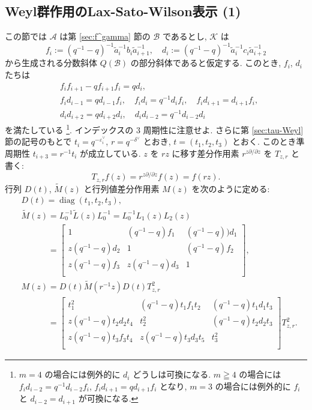 \documentclass[12pt,twoside,dvipdfm]{msjproc}
\theoremstyle{definition} %
\theoremstyle{definition} %
\theoremstyle{definition} %
\numberwithin{theorem}{section}
\numberwithin{equation}{section}
\numberwithin{figure}{section}
\numberwithin{table}{section}
\newcommand\secref[1]{第 \ref{#1} 節}
\newcommand\A{\mathcal{A}}
\newcommand\K{\mathcal{K}}
\newcommand\B{\mathcal{B}}
\newcommand\diag{\mathop{\mathrm{diag}}\nolimits}
\newcommand\tL{{\widetilde{L}}}
\newcommand\tM{{\widetilde{M}}}
\newcommand\ta{{\tilde{a}}}
\newcommand\ev{\varepsilon^\vee}
\newcommand\dv{\delta^\vee}
\begin{document}
\subsection{Weyl群作用のLax-Sato-Wilson表示 (1)}
\label{sec:Sato-Wilson-1}

この節では $\A$ は\secref{sec:f^gamma}の $\B$ であるとし, 
$\K$ は
\begin{equation*}
  f_i:=(q^{-1}-q)^{-1}\ta_i^{-1}b_i\ta_{i+1}^{-1}, \quad
  d_i:=(q^{-1}-q)^{-1}\ta_i^{-1}c_i\ta_{i+2}^{-1}
\end{equation*}
から生成される分数斜体 $Q(\B)$ の部分斜体であると仮定する.
このとき, $f_i$, $d_i$ たちは
\begin{align*}
 &
 f_i f_{i+1} - q f_{i+1}f_i = q d_i,
 \\ &
 f_id_{i-1}=q d_{i-1}f_i, \quad
 f_id_i=q^{-1} d_i f_i, \quad
 f_id_{i+1}=d_{i+1}f_i,
 \\ &
 d_i d_{i+2} = q d_{i+2} d_i, \quad
 d_i d_{i-2} = q^{-1} d_{i-2} d_i
\end{align*}
を満たしている%
\footnote{$m=4$ の場合には例外的に $d_i$ どうしは可換になる.
$m\geqq4$ の場合には $f_id_{i-2}=q^{-1}d_{i-2}f_i$, $f_id_{i+1}=qd_{i+1}f_i$ となり, 
$m=3$ の場合には例外的に $f_i$ と $d_{i-2}=d_{i+1}$ が可換になる.}. %
インデックスの $3$ 周期性に注意せよ.
さらに\secref{sec:tau-Weyl}の記号のもとで $t_i = q^{-\ev_i}$, $r=q^{-\dv}$ とおき, 
$t=(t_1,t_2,t_3)$ とおく. このとき準周期性 $t_{i+3}=r^{-1}t_i$
が成立している. 
$z$ を $rz$ に移す差分作用素 $r^{z\partial/\partial z}$ を $T_{z,r}$ と書く:
\begin{equation*}
  T_{z,r}f(z) = r^{z\partial/\partial z}f(z) = f(rz).
\end{equation*}
行列 $D(t)$, $\tM(z)$ と行列値差分作用素 $M(z)$ を次のように定める: 
\begin{align*}
  &
  D(t) = \diag(t_1,t_2,t_3), 
  \\ &
  \tM(z) = L_0^{-1}\tL(z)L_0^{-1} = L_0^{-1}L_1(z)L_2(z)
  \\ &
  \phantom{\tM(z)}=
  \begin{bmatrix}
    1               & (q^{-1}-q) f_1 & (q^{-1}-q))d_1 \\
    z (q^{-1}-q)d_2 & 1              & (q^{-1}-q)f_2  \\
    z (q^{-1}-q)f_3 & z(q^{-1}-q)d_3 & 1              \\
  \end{bmatrix},
  \\ &
  M(z)
  = D(t)\tM(r^{-1}z)D(t)T_{z,r}^2
  \\ &
  \phantom{M(z)}=
  \begin{bmatrix}
    t_1^2     &   (q^{-1}-q)t_1f_1t_2 & (q^{-1}-q)t_1d_1t_3 \\
    z (q^{-1}-q)t_2d_2t_4 &   t_2^2     & (q^{-1}-q)t_2d_2t_3 \\
    z (q^{-1}-q)t_3f_3t_4 & z (q^{-1}-q)t_3d_3t_5 & t_3^2 \\
  \end{bmatrix}
  T_{z,r}^2.
\end{align*}
\end{document}
